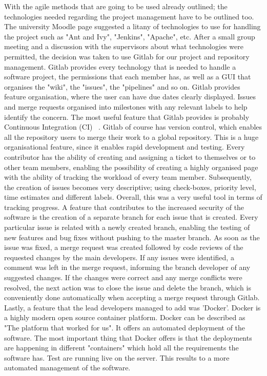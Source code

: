 \documentclass{l3proj}
\begin{document}
With the agile methods that are going to be used already outlined; the technologies needed regarding the project management have to be outlined too. The university Moodle page suggested a litany of technologies to use for handling the project such as "Ant and Ivy", "Jenkins", "Apache", etc. After a small group meeting and a discussion with the supervisors about what technologies were permitted, the decision was taken to use Gitlab \cite{Gitlab} for our project and repository management. Gitlab provides every technology that is needed to handle a software project, the permissions that each member has, as well as a GUI that organises the "wiki", the "issues", the "pipelines" and so on. Gitlab provides feature organisation, where the user can have due dates clearly displayed. Issues and merge requests organised into milestones with any relevant labels to help identify the concern. The most useful feature that Gitlab provides is probably Continuous Integration (CI) ~\cite{ci}. Gitlab of course has version control, which enables all the repository users to merge their work to a global repository. This is a huge organisational feature, since it enables rapid development and testing. Every contributor has the ability of creating and assigning a ticket to themselves or to other team members, enabling the possibility of creating a highly organised page with the ability of tracking the workload of every team member. Subsequently, the creation of issues becomes very descriptive; using check-boxes, priority level, time estimates and different labels. Overall, this was a very useful tool in terms of tracking progress. A feature that contributes to the increased security of the software is the creation of a separate branch for each issue that is created. Every particular issue is related with a newly created branch, enabling the testing of new features and bug fixes without pushing to the master branch. As soon as the issue was fixed, a merge request was created followed by code reviews of the requested changes by the main developers. If any issues were identified, a comment was left in the merge request, informing the branch developer of any suggested changes. If the changes were correct and any merge conflicts were resolved, the next action was to close the issue and delete the branch, which is conveniently done automatically when accepting a merge request through Gitlab. Lastly, a feature that the lead developers managed to add was 'Docker'. Docker is a highly modern open source container platform. Docker can be described as "The platform that worked for us". It offers an automated deployment of the software. The most important thing that Docker offers is that the deployments are happening in different "containers" which hold all the requirements the software has. Test are running live on the server. This results to a more automated management of the software.
\end{document}
